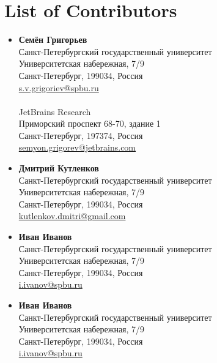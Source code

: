 \chapter*{List of Contributors}
\begin{multicols}{2}
    \begin{itemize}
        \item \textbf{Семён Григорьев} \\
              Санкт-Петербургский государственный университет \\
              Университетская набережная, 7/9 \\
              Санкт-Петербург, 199034, Россия \\
              \url{s.v.grigoriev@spbu.ru}\\
              \\
              JetBrains Research \\
              Приморский проспект 68-70, здание 1 \\
              Санкт-Петербург, 197374, Россия \\
              \url{semyon.grigorev@jetbrains.com}
             

        \item \textbf{Дмитрий Кутленков} \\
              Санкт-Петербургский государственный университет \\
              Университетская набережная, 7/9 \\
              Санкт-Петербург, 199034, Россия \\
              \url{kutlenkov.dmitri@gmail.com}

        \item \textbf{Иван Иванов} \\
              Санкт-Петербургский государственный университет \\
              Университетская набережная, 7/9 \\
              Санкт-Петербург, 199034, Россия \\
              \url{i.ivanov@spbu.ru}

        \item \textbf{Иван Иванов} \\
              Санкт-Петербургский государственный университет \\
              Университетская набережная, 7/9 \\
              Санкт-Петербург, 199034, Россия \\
              \url{i.ivanov@spbu.ru}


\end{itemize}
\end{multicols}
